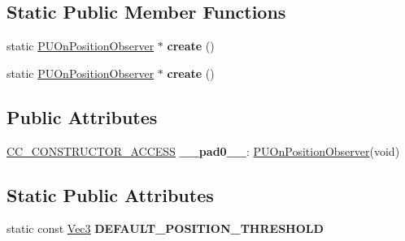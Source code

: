\subsection*{Static Public Member Functions}
\begin{DoxyCompactItemize}
\item 
\mbox{\label{classPUOnPositionObserver_acbc6d183833872756c808d6c5b8faaa2}} 
static \hyperlink{classPUOnPositionObserver}{P\+U\+On\+Position\+Observer} $\ast$ {\bfseries create} ()
\item 
\mbox{\label{classPUOnPositionObserver_a6875a9bbe18f1dd6be7c5a729d90cdee}} 
static \hyperlink{classPUOnPositionObserver}{P\+U\+On\+Position\+Observer} $\ast$ {\bfseries create} ()
\end{DoxyCompactItemize}
\subsection*{Public Attributes}
\begin{DoxyCompactItemize}
\item 
\mbox{\label{classPUOnPositionObserver_a38b5929e080e9f0a28417a022858b4ce}} 
\hyperlink{_2cocos2d_2cocos_2base_2ccConfig_8h_a25ef1314f97c35a2ed3d029b0ead6da0}{C\+C\+\_\+\+C\+O\+N\+S\+T\+R\+U\+C\+T\+O\+R\+\_\+\+A\+C\+C\+E\+SS} {\bfseries \+\_\+\+\_\+pad0\+\_\+\+\_\+}\+: \hyperlink{classPUOnPositionObserver}{P\+U\+On\+Position\+Observer}(void)
\end{DoxyCompactItemize}
\subsection*{Static Public Attributes}
\begin{DoxyCompactItemize}
\item 
\mbox{\label{classPUOnPositionObserver_a779f3ac0d135276f8fc0edbb97328651}} 
static const \hyperlink{classVec3}{Vec3} {\bfseries D\+E\+F\+A\+U\+L\+T\+\_\+\+P\+O\+S\+I\+T\+I\+O\+N\+\_\+\+T\+H\+R\+E\+S\+H\+O\+LD}
\end{DoxyCompactItemize}
